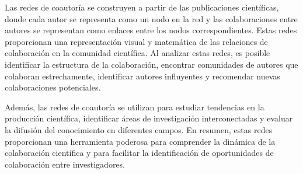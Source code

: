 Las redes de coautoría se construyen a partir de las publicaciones científicas, donde cada autor se representa como un nodo en la red y las colaboraciones entre autores se representan como enlaces entre los nodos correspondientes. Estas redes proporcionan una representación visual y matemática de las relaciones de colaboración en la comunidad científica. Al analizar estas redes, es posible identificar la estructura de la colaboración, encontrar comunidades de autores que colaboran estrechamente, identificar autores influyentes y recomendar nuevas colaboraciones potenciales.

Además, las redes de coautoría se utilizan para estudiar tendencias en la producción científica, identificar áreas de investigación interconectadas y evaluar la difusión del conocimiento en diferentes campos. En resumen, estas redes proporcionan una herramienta poderosa para comprender la dinámica de la colaboración científica y para facilitar la identificación de oportunidades de colaboración entre investigadores.